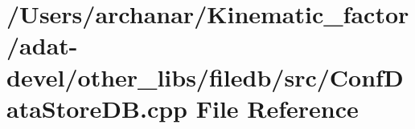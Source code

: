 \hypertarget{adat-devel_2other__libs_2filedb_2src_2ConfDataStoreDB_8cpp}{}\section{/\+Users/archanar/\+Kinematic\+\_\+factor/adat-\/devel/other\+\_\+libs/filedb/src/\+Conf\+Data\+Store\+DB.cpp File Reference}
\label{adat-devel_2other__libs_2filedb_2src_2ConfDataStoreDB_8cpp}
